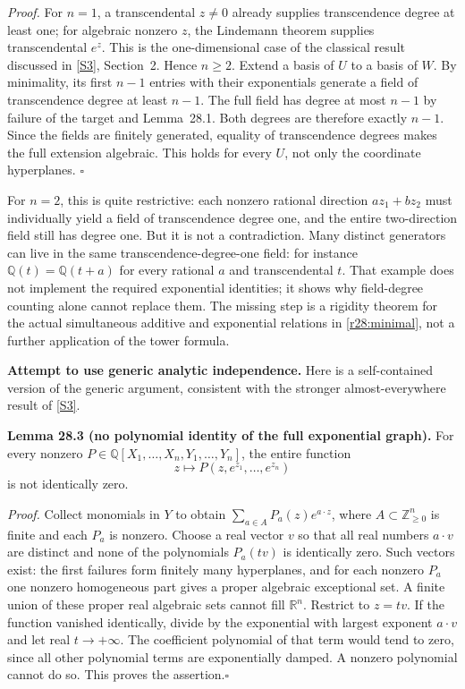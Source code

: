 \documentclass[11pt,a4paper]{article}
\newcommand{\Z}{\mathbb{Z}}
\newcommand{\Q}{\mathbb{Q}}
\newcommand{\R}{\mathbb{R}}
\newcommand{\sref}[2]{\hyperlink{source:#1:#2}{[S#2]}}
\numberwithin{equation}{section}
\begin{document}
\emph{Proof.} For $n=1$, a transcendental $z\ne0$ already supplies
transcendence degree at least one; for algebraic nonzero $z$, the
Lindemann theorem supplies transcendental $e^z$. This is the
one-dimensional case of the classical result discussed in
\sref{3367}{3}, Section~2. Hence $n\ge2$. Extend a basis of $U$ to a basis
of $W$. By minimality, its first $n-1$ entries with their exponentials
generate a field of transcendence degree at least $n-1$. The full field
has degree at most $n-1$ by failure of the target and Lemma~28.1. Both
degrees are therefore exactly $n-1$. Since the fields are finitely
generated, equality of transcendence degrees makes the full extension
algebraic. This holds for every $U$, not only the coordinate hyperplanes.
\hfill$\square$

For $n=2$, this is quite restrictive: each nonzero rational direction
$az_1+bz_2$ must individually yield a field of transcendence degree one,
and the entire two-direction field still has degree one. But it is not
a contradiction. Many distinct generators can live in the same
transcendence-degree-one field: for instance $\Q(t)=\Q(t+a)$ for every
rational $a$ and transcendental $t$. That example does not implement the
required exponential identities; it shows why field-degree counting alone
cannot replace them. The missing step is a rigidity theorem for the
actual simultaneous additive and exponential relations in
\eqref{r28:minimal}, not a further application of the tower formula.

\medskip
\textbf{Attempt to use generic analytic independence.}
Here is a self-contained version of the generic argument, consistent
with the stronger almost-everywhere result of \sref{3367}{3}.

\textbf{Lemma 28.3 (no polynomial identity of the full exponential graph).}
For every nonzero $P\in\Q[X_1,\ldots,X_n,Y_1,\ldots,Y_n]$, the entire
function
\[
                    z\longmapsto P(z,e^{z_1},\ldots,e^{z_n})
\]
is not identically zero.

\emph{Proof.} Collect monomials in $Y$ to obtain
$\sum_{a\in A}P_a(z)e^{a\cdot z}$, where $A\subset\Z_{\ge0}^n$ is finite
and each $P_a$ is nonzero. Choose a real vector $v$ so that all real
numbers $a\cdot v$ are distinct and none of the polynomials $P_a(tv)$
is identically zero. Such vectors exist: the first failures form finitely
many hyperplanes, and for each nonzero $P_a$ one nonzero homogeneous
part gives a proper algebraic exceptional set. A finite union of these
proper real algebraic sets cannot fill $\R^n$.
Restrict to $z=tv$. If the function vanished identically, divide by the
exponential with largest exponent $a\cdot v$ and let real $t\to+\infty$.
The coefficient polynomial of that term would tend to zero, since all
other polynomial terms are exponentially damped. A nonzero polynomial
cannot do so. This proves the assertion.\hfill$\square$
\end{document}
